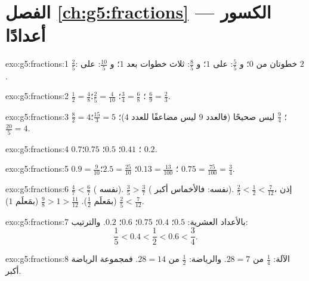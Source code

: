 \section*{الفصل \ref{ch:g5:fractions} --- الكسور أعدادًا}

\begin{solution}{exo:g5:fractions:1}
$\frac25$: خطوتان من $0$؛ و $\frac55$: على $1$؛ و $\frac85$: ثلاث
خطوات بعد $1$؛ و $\frac{10}{5}$: على $2$.
\end{solution}

\begin{solution}{exo:g5:fractions:2}
$\frac12 = \frac48$؛ \quad $\frac34 = \frac68$؛ \quad
$\frac25 = \frac{4}{10}$؛ \quad $\frac69 = \frac23$.
\end{solution}

\begin{solution}{exo:g5:fractions:3}
$\frac82 = 4$؛ \quad $\frac94$ ليس صحيحًا (فالعدد $9$ ليس مضاعفًا
للعدد $4$)؛ \quad $\frac{15}{3} = 5$؛ \quad $\frac{20}{5} = 4$.
\end{solution}

\begin{solution}{exo:g5:fractions:4}
$0.7$؛ \quad $0.41$؛ \quad $0.5$؛ \quad $0.75$؛ \quad $0.2$.
\end{solution}

\begin{solution}{exo:g5:fractions:5}
$0.9 = \frac{9}{10}$؛ \quad $0.13 = \frac{13}{100}$؛ \quad
$2.5 = \frac{25}{10}$؛ \quad $0.75 = \frac{75}{100} = \frac34$.
\end{solution}

\begin{solution}{exo:g5:fractions:6}
$\frac47 < \frac67$ ( نفسه). \quad
$\frac35 > \frac37$ ( نفسه: فالأخماس أكبر). \quad
$\frac25 < \frac12 < \frac{7}{12}$، إذن $\frac25 < \frac{7}{12}$
(بمَعلَم $\frac12$). \quad
$\frac98 > 1 > \frac{11}{12}$ (بمَعلَم $1$).
\end{solution}

\begin{solution}{exo:g5:fractions:7}
بالأعداد العشرية: $0.5$؛ $0.4$؛ $0.75$؛ $0.6$؛ $0.2$. والترتيب:
\[
\frac15 < 0.4 < \frac12 < 0.6 < \frac34 .
\]
\end{solution}

\begin{solution}{exo:g5:fractions:8}
الآلة: $\frac14$ من $28 = 7$. والرياضة: $\frac12$ من $28 = 14$.
فمجموعة الرياضة أكبر.
\end{solution}

